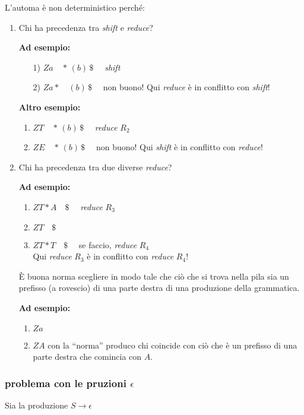L'automa è non deterministico perché:
\begin{enumerate}
    \item Chi ha precedenza tra \textit{shift} e \textit{reduce}?
    
    \textbf{Ad esempio:}
    \begin{enumerate}
        \item[1)] $Z a \quad * \, (b) \, \$ \quad$ \textit{shift}
        \item[2)] $Z a * \quad (b) \, \$ \quad$ non buono! Qui \textit{reduce} è in conflitto con \textit{shift}!
    \end{enumerate}
    
    \textbf{Altro esempio:}
    \begin{enumerate}
        \item $Z T \quad * \, (b) \, \$ \quad$ \textit{reduce } $R_2$
        \item $Z E \quad * \, (b) \, \$ \quad$ non buono! Qui \textit{shift} è in conflitto con \textit{reduce}!
    \end{enumerate}
    
    \item Chi ha precedenza tra due diverse \textit{reduce}?
    
    \textbf{Ad esempio:}
    \begin{enumerate}
        \item $Z T * A \quad \$ \quad$ \textit{reduce } $R_3$
        \item $Z T \quad \$$
        \item $Z T * T \quad \$ \quad$ se faccio, \textit{reduce } $R_4$ \\
        Qui \textit{reduce} $R_3$ è in conflitto con \textit{reduce} $R_4$!
    \end{enumerate}
    
    È buona norma scegliere in modo tale che ciò che si trova nella pila sia un prefisso (a rovescio) di una parte destra di una produzione della grammatica.
    
    \textbf{Ad esempio:}
    \begin{enumerate}
        \item $Z a$
        \item $Z A$ con la ``norma'' produco chi coincide con ciò che è un prefisso di una parte destra che comincia con $A$.
    \end{enumerate}
\end{enumerate}

\subsubsection{problema con le pruzioni $\epsilon$}
Sia la produzione $S\to \epsilon$

